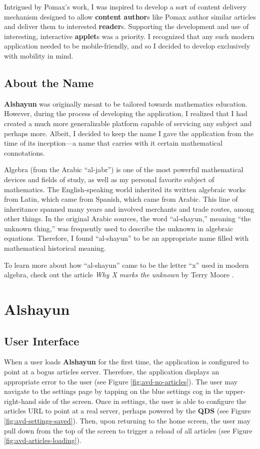 \documentclass[12pt]{report}
\begin{document}
Intrigued by Pomax's work, I was inspired to develop a sort of content delivery
mechanism designed to allow \textbf{content author}s like Pomax author similar
articles and deliver them to interested \textbf{reader}s. Supporting the
development and use of interesting, interactive \textbf{applet}s was a priority.
I recognized that any such modern application needed to be mobile-friendly, and
so I decided to develop exclusively with mobility in mind.

    \section{About the Name}

\textbf{Alshayun} was originally meant to be tailored towards mathematics
education.  However, during the process of developing the application, I
realized that I had created a much more generalizable platform capable of
servicing any subject and perhaps more. Albeit, I decided to keep the name I
gave the application from the time of its inception---a name that carries with
it certain mathematical connotations.

Algebra (from the Arabic ``al-jabr'') is one of the most powerful mathematical
devices and fields of study, as well as my personal favorite subject of
mathematics. The English-speaking world inherited its written algebraic works
from Latin, which came from Spanish, which came from Arabic. This line of
inheritance spanned many years and involved merchants and trade routes, among
other things. In the original Arabic sources, the word ``al-shayun,'' meaning
``the unknown thing,'' was frequently used to describe the unknown in algebraic
equations. Therefore, I found ``al-shayun'' to be an appropriate name filled
with mathematical historical meaning.

To learn more about how ``al-shayun'' came to be the letter ``x'' used in modern
algebra, check out the article \textit{Why X marks the unknown} by Terry Moore
\cite{moore}.

\chapter{Alshayun}

    \section{User Interface}

When a user loads \textbf{Alshayun} for the first time, the application is
configured to point at a bogus articles server. Therefore, the application
displays an appropriate error to the user (see Figure
\ref{fig:avd-no-articles}).  The user may navigate to the settings page by
tapping on the blue settings cog in the upper-right-hand side of the screen.
Once in settings, the user is able to configure the articles URL to point at a
real server, perhaps powered by the \textbf{QDS} (see Figure
\ref{fig:avd-settings-saved}). Then, upon returning to the home screen, the user
may pull down from the top of the screen to trigger a reload of all articles
(see Figure \ref{fig:avd-articles-loading}).
\end{document}
